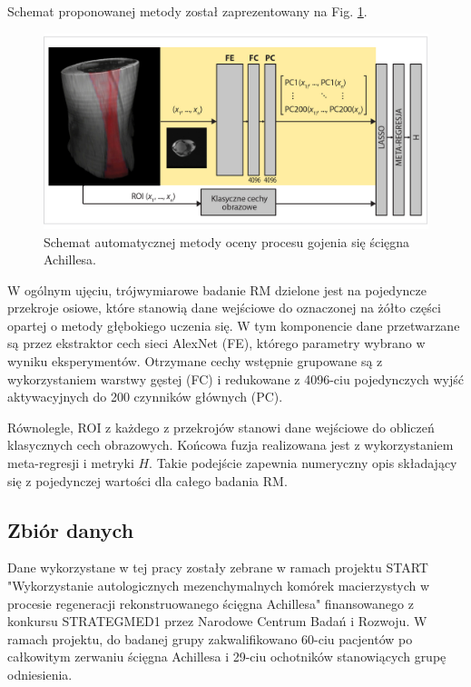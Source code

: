 Schemat proponowanej metody został zaprezentowany na Fig. \ref{fig:net}. 
\begin{figure}[h!]
	\includegraphics[width=\textwidth]{figures/net.jpg}
	\caption{Schemat automatycznej metody oceny procesu gojenia się ścięgna Achillesa.} \label{fig:net}
\end{figure}
W ogólnym ujęciu, trójwymiarowe badanie RM dzielone jest na pojedyncze przekroje osiowe, które stanowią dane wejściowe do oznaczonej na żółto części opartej o metody głębokiego uczenia się. W tym komponencie dane przetwarzane są przez ekstraktor cech sieci AlexNet (FE), którego parametry wybrano w wyniku eksperymentów. Otrzymane cechy wstępnie grupowane są z wykorzystaniem warstwy gęstej (FC) \linebreak i redukowane z 4096-ciu pojedynczych wyjść aktywacyjnych do 200 czynników głównych (PC).

Równolegle, ROI z każdego z przekrojów stanowi dane wejściowe do obliczeń klasycznych cech obrazowych. Końcowa fuzja realizowana jest z wykorzystaniem meta-regresji i metryki $H$. Takie podejście zapewnia numeryczny opis składający się z pojedynczej wartości dla całego badania RM.

\subsection{Zbiór danych}
\label{seq:zbior-danych}
Dane wykorzystane w tej pracy zostały zebrane w ramach projektu START "Wykorzystanie autologicznych mezenchymalnych komórek macierzystych w procesie regeneracji rekonstruowanego ścięgna Achillesa" finansowanego z konkursu STRATEGMED1 przez Narodowe Centrum Badań i Rozwoju. W ramach projektu, \linebreak do badanej grupy zakwalifikowano 60-ciu pacjentów po całkowitym zerwaniu ścięgna Achillesa i 29-ciu ochotników stanowiących grupę odniesienia. 

